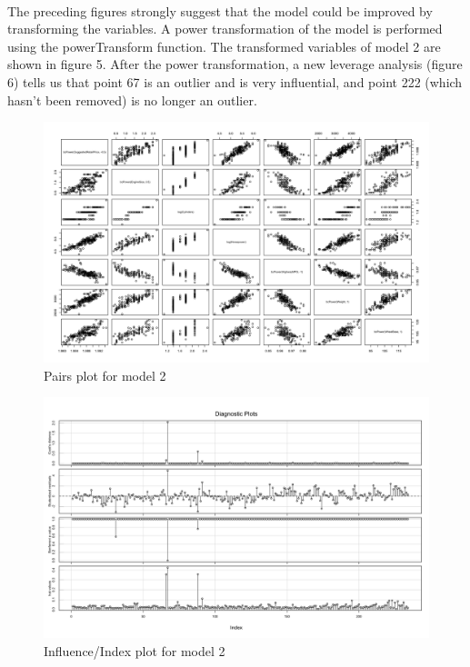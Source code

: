 \documentclass{article}
\begin{document}
\paragraph{}
The preceding figures strongly suggest that the model could be improved by transforming the variables. A power transformation of the model is performed using the powerTransform function. The transformed variables of model 2 are shown in figure 5. After the power transformation, a new leverage analysis (figure 6) tells us that point 67 is an outlier and is very influential, and point 222 (which hasn't been removed) is no longer an outlier.


\begin{figure}[h!]				
	\centering
	\includegraphics[width=14cm]{Part1_Pairs_Transformed}
	\caption{Pairs plot for model 2}
\end{figure}

\begin{figure}[h!]				
	\centering
	\includegraphics[width=14cm]{Part1_influenceplot_transformed}
	\caption{Influence/Index plot for model 2}
\end{figure}
\end{document}
